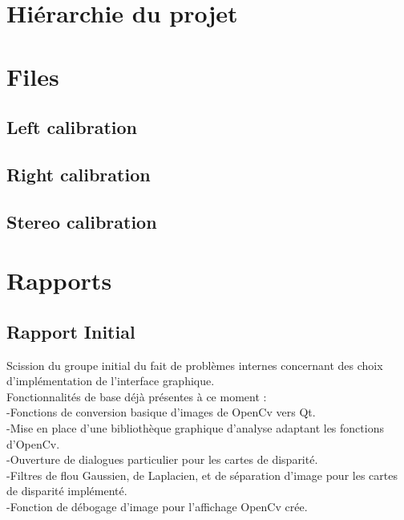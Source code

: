 \documentclass{article}
\begin{document}
\newpage
\section{Hiérarchie du projet}


\newpage
\section{Files}

\subsection{Left calibration}



\newpage
\subsection{Right calibration}



\newpage
\subsection{Stereo calibration}



\newpage
\section{Rapports}
\subsection{Rapport Initial}
Scission du groupe initial du fait de problèmes internes concernant des choix d'implémentation de l'interface graphique.\\

Fonctionnalités de base déjà présentes à ce moment :\\
	-Fonctions de conversion basique d'images de OpenCv vers Qt.\\
	-Mise en place d'une bibliothèque graphique d'analyse adaptant les fonctions d'OpenCv.\\
	-Ouverture de dialogues particulier pour les cartes de disparité.\\
	-Filtres de flou Gaussien, de Laplacien, et de séparation d'image pour les cartes de disparité implémenté.\\
	-Fonction de débogage d'image pour l'affichage OpenCv crée.\\
\end{document}
